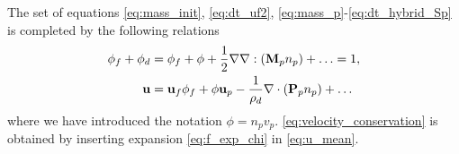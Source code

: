 
The set of equations \ref{eq:mass_init}, \ref{eq:dt_uf2}, \ref{eq:mass_p}-\ref{eq:dt_hybrid_Sp} is completed by the following relations %
\begin{align}
    \phi_f + \phi_d &= 
    \phi_f + \phi  + \frac{1}{2}\grad\grad : (\textbf{M}_p n_p) + \ldots = 1,
    \label{eq:volume_conservation}\\
    \textbf{u} &= \textbf{u}_f\phi_f + 
    \phi\textbf{u}_p - \frac{1}{\rho_d} \div  (\textbf{P}_p n_p) + \ldots
    \label{eq:velocity_conservation}
\end{align}
where we have introduced the notation $\phi = n_pv_p$. 
\ref{eq:velocity_conservation} is obtained by inserting expansion \ref{eq:f_exp_chi} in \ref{eq:u_mean}.

